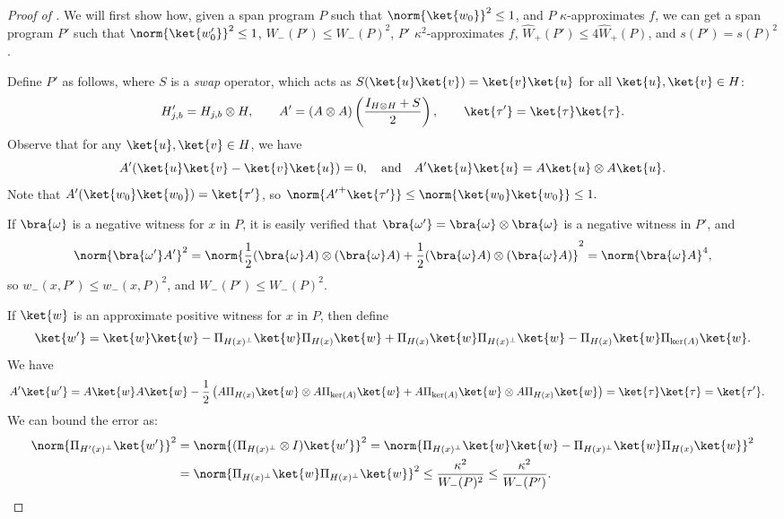 \documentclass[11pt]{article}
\numberwithin{equation}{section}
\theoremstyle{definition}
\theoremstyle{plain}
\begin{document}
\begin{proof}[Proof of ]
We will first show how, given a span program $P$ such that $\norm{\ket{w_0}}^2\leq 1$,  
and $P$ $\kappa$-approximates $f$, we can get a  span program $P'$ such that $\norm{\ket{w_0'}}^2\leq 1$, $W_-(P')\leq W_-(P)^2$, $P'$ $\kappa^2$-approximates $f$, $\widehat{W}_+(P')\leq 4\widehat{W}_+(P)$, and $s(P')=s(P)^2$.

Define $P'$ as follows, where $S$ is a \emph{swap} operator, which acts as $S(\ket{u}\ket{v})=\ket{v}\ket{u}$ for all $\ket{u},\ket{v}\in H$:
$$H_{j,b}'=H_{j,b}\otimes H,\qquad
A' = (A\otimes A)\left(\frac{I_{H\otimes H}+S}{2}\right),\qquad
\ket{\tau'}=\ket{\tau}\ket{\tau}.$$
Observe that for any $\ket{u},\ket{v}\in H$, we have
$$A'(\ket{u}\ket{v}-\ket{v}\ket{u})=0,\quad\mbox{and}\quad
A'\ket{u}\ket{u}=A\ket{u}\otimes A\ket{u}.$$
Note that $A'(\ket{w_0}\ket{w_0})=\ket{\tau'}$, so 
$\norm{{A'}^+\ket{\tau'}}\leq \norm{\ket{w_0}\ket{w_0}}\leq 1.$


If $\bra{\omega}$ is a negative witness for $x$ in $P$, it is easily verified that $\bra{\omega'}=\bra{\omega}\otimes\bra{\omega}$ is a negative witness in $P'$, 
and
$$\norm{\bra{\omega'}A'}^2 = \norm{\frac{1}{2}(\bra{\omega} A)\otimes (\bra{\omega}A)+\frac{1}{2}(\bra{\omega} A)\otimes (\bra{\omega}A)}^2 = \norm{\bra{\omega}A}^4,$$
so 
$w_-(x,P')\leq w_-(x,P)^2$, and $W_-(P')\leq W_-(P)^2$. 


If $\ket{w}$ is an approximate positive witness for $x$ in $P$, then define
$$\ket{w'}=\ket{w}\ket{w} - \Pi_{H(x)^\bot}\ket{w}\Pi_{H(x)}\ket{w}+\Pi_{H(x)}\ket{w}\Pi_{H(x)^\bot}\ket{w}-\Pi_{H(x)}\ket{w}\Pi_{\ker(A)}\ket{w}.$$
We have
\begin{align*}
A'\ket{w'} &= A\ket{w} A\ket{w} - \frac{1}{2}\left(A\Pi_{H(x)}\ket{w}\otimes A\Pi_{\ker(A)}\ket{w}+A\Pi_{\ker(A)}\ket{w}\otimes A\Pi_{H(x)}\ket{w}\right)
= \ket{\tau}\ket{\tau}=\ket{\tau'}.
\end{align*}
We can bound the error as:
\begin{align*}
\norm{\Pi_{H'(x)^\bot}\ket{w'}}^2 &= \norm{(\Pi_{H(x)^\bot}\otimes I)\ket{w'}}^2
= \norm{\Pi_{H(x)^\bot}\ket{w}\ket{w}-\Pi_{H(x)^\bot}\ket{w}\Pi_{H(x)}\ket{w}}^2\\
&= \norm{\Pi_{H(x)^\bot}\ket{w}\Pi_{H(x)^\bot}\ket{w}}^2
\leq \frac{\kappa^2}{W_-(P)^2}\leq \frac{\kappa^2}{W_-(P')}.
\end{align*}


\end{proof}
\end{document}
